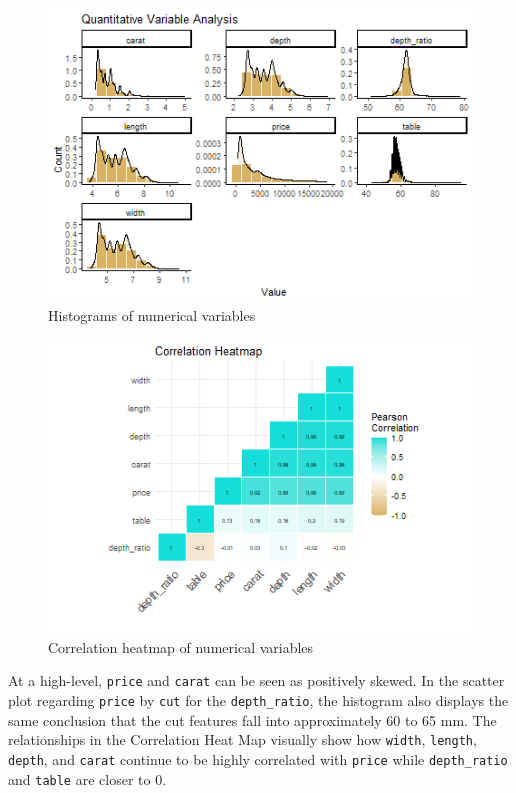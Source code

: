 \documentclass[
  paper=a4,
  ,captions=tableheading
]{scrartcl}
\begin{document}
\begin{figure}[H]

{\centering \includegraphics[width=\linewidth,]{Diamonds_PDF_files/figure-latex/Histograms-1} 

}

\caption{Histograms of numerical variables}\label{fig:Histograms}
\end{figure}

\begin{figure}[H]

{\centering \includegraphics[width=0.5\linewidth,]{Diamonds_PDF_files/figure-latex/Correlation-1} 

}

\caption{Correlation heatmap of numerical variables}\label{fig:Correlation}
\end{figure}

At a high-level, \texttt{price} and \texttt{carat} can be seen as
positively skewed. In the scatter plot regarding \texttt{price} by
\texttt{cut} for the \texttt{depth\_ratio}, the histogram also displays
the same conclusion that the cut features fall into approximately 60 to
65 mm. The relationships in the Correlation Heat Map visually show how
\texttt{width}, \texttt{length}, \texttt{depth}, and \texttt{carat}
continue to be highly correlated with \texttt{price} while
\texttt{depth\_ratio} and \texttt{table} are closer to 0.
\end{document}
